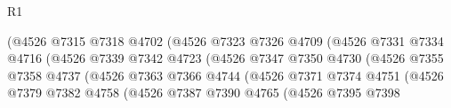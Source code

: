 \begin{lexlean}{R1}
\begin{coremodule}
                                            (@4526
                                              @7315
                                              @7318
                                              @4702
                                              (@4526
                                                @7323
                                                @7326
                                                @4709
                                                (@4526
                                                  @7331
                                                  @7334
                                                  @4716
                                                  (@4526
                                                    @7339
                                                    @7342
                                                    @4723
                                                    (@4526
                                                      @7347
                                                      @7350
                                                      @4730
                                                      (@4526
                                                        @7355
                                                        @7358
                                                        @4737
                                                        (@4526
                                                          @7363
                                                          @7366
                                                          @4744
                                                          (@4526
                                                            @7371
                                                            @7374
                                                            @4751
                                                            (@4526
                                                              @7379
                                                              @7382
                                                              @4758
                                                              (@4526
                                                                @7387
                                                                @7390
                                                                @4765
                                                                (@4526
                                                                  @7395
                                                                  @7398

\end{coremodule}
\end{lexlean}
